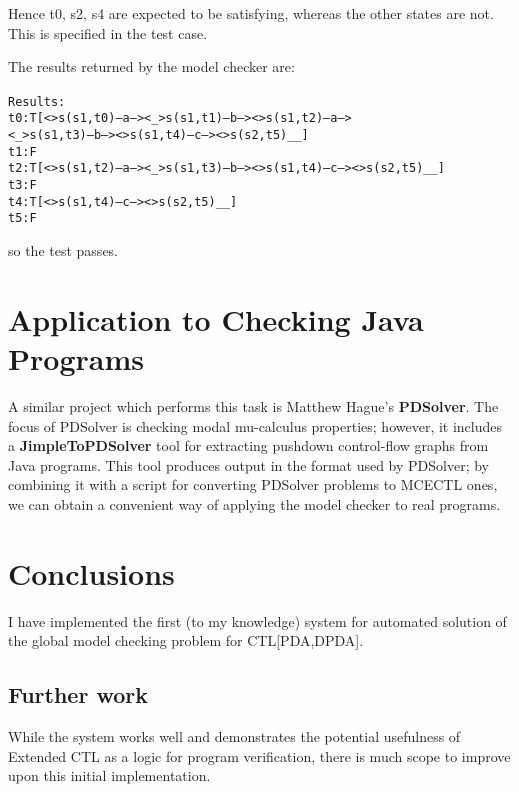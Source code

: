 \documentclass[11pt]{article}
\theoremstyle{definition}
\begin{document}
Hence t0, s2, s4 are expected to be satisfying, whereas the other states are
not. This is specified in the test case.

The results returned by the model checker are:
\footnotesize
\begin{alltt}
Results: {
   t0: T     [ <> s(s1,t0) --a--> <_> s(s1,t1) --b--> <> s(s1,t2) --a--> 
               <_> s(s1,t3) --b--> <> s(s1,t4) --c--> <> s(s2,t5)__ ]
   t1: F
   t2: T     [ <> s(s1,t2) --a--> <_> s(s1,t3) --b--> <> s(s1,t4) --c--> <> s(s2,t5)__ ]
   t3: F
   t4: T     [ <> s(s1,t4) --c--> <> s(s2,t5)__ ]
   t5: F
}
\end{alltt}
\normalsize
so the test passes.



\section{Application to Checking Java Programs}

A similar project which performs this task is Matthew Hague's
\textbf{PDSolver}\cite{hague2010analysing}.  The focus of PDSolver is checking
modal mu-calculus properties; however, it includes a \textbf{JimpleToPDSolver}
tool for extracting pushdown control-flow graphs from Java programs. This tool
produces output in the format used by PDSolver; by combining it with a script
for converting PDSolver problems to MCECTL ones, we can obtain a convenient way
of applying the model checker to real programs.

\section{Conclusions}

I have implemented the first (to my knowledge) system for automated solution of
the global model checking problem for CTL[PDA,DPDA].





\subsection{Further work}

While the system works well and demonstrates the potential usefulness of
Extended CTL as a logic for program verification, there is much scope to
improve upon this initial implementation. 
\end{document}
